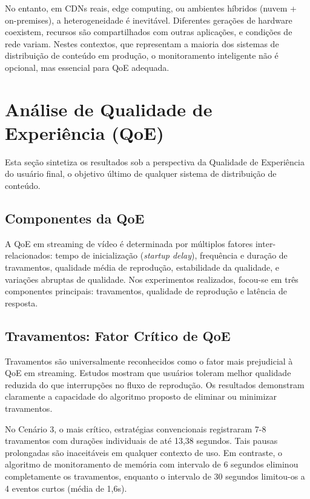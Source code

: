 No entanto, em CDNs reais, edge computing, ou ambientes híbridos (nuvem + on-premises), a heterogeneidade é inevitável. Diferentes gerações de hardware coexistem, recursos são compartilhados com outras aplicações, e condições de rede variam. Nestes contextos, que representam a maioria dos sistemas de distribuição de conteúdo em produção, o monitoramento inteligente não é opcional, mas essencial para QoE adequada.

\section{Análise de Qualidade de Experiência (QoE)}

Esta seção sintetiza os resultados sob a perspectiva da Qualidade de Experiência do usuário final, o objetivo último de qualquer sistema de distribuição de conteúdo.

\subsection{Componentes da QoE}

A QoE em streaming de vídeo é determinada por múltiplos fatores inter-relacionados: tempo de inicialização (\textit{startup delay}), frequência e duração de travamentos, qualidade média de reprodução, estabilidade da qualidade, e variações abruptas de qualidade. Nos experimentos realizados, focou-se em três componentes principais: travamentos, qualidade de reprodução e latência de resposta.

\subsection{Travamentos: Fator Crítico de QoE}

Travamentos são universalmente reconhecidos como o fator mais prejudicial à QoE em streaming. Estudos mostram que usuários toleram melhor qualidade reduzida do que interrupções no fluxo de reprodução. Os resultados demonstram claramente a capacidade do algoritmo proposto de eliminar ou minimizar travamentos.

No Cenário 3, o mais crítico, estratégias convencionais registraram 7-8 travamentos com durações individuais de até 13,38 segundos. Tais pausas prolongadas são inaceitáveis em qualquer contexto de uso. Em contraste, o algoritmo de monitoramento de memória com intervalo de 6 segundos eliminou completamente os travamentos, enquanto o intervalo de 30 segundos limitou-os a 4 eventos curtos (média de 1,6s).

